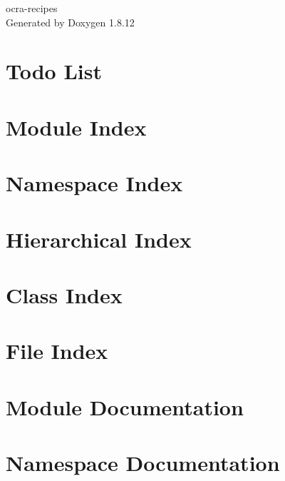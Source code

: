 \documentclass[twoside]{book}
\newcommand{\+}{\discretionary{\mbox{\scriptsize$\hookleftarrow$}}{}{}}
\newcommand{\clearemptydoublepage}{%
  \newpage{\pagestyle{empty}\cleardoublepage}%
}
\begin{document}
\hypersetup{pageanchor=false,
             bookmarksnumbered=true,
             pdfencoding=unicode
            }
\begin{titlepage}
\vspace*{7cm}
\begin{center}%
{\Large ocra-\/recipes }\\
\vspace*{1cm}
{\large Generated by Doxygen 1.8.12}\\
\end{center}
\end{titlepage}
\clearemptydoublepage
{}
\tableofcontents
\clearemptydoublepage
{}
\hypersetup{pageanchor=true}

\chapter{Todo List}
\label{todo}
\hypertarget{todo}{}

\chapter{Module Index}

\chapter{Namespace Index}

\chapter{Hierarchical Index}

\chapter{Class Index}

\chapter{File Index}

\chapter{Module Documentation}





\chapter{Namespace Documentation}








\end{document}

